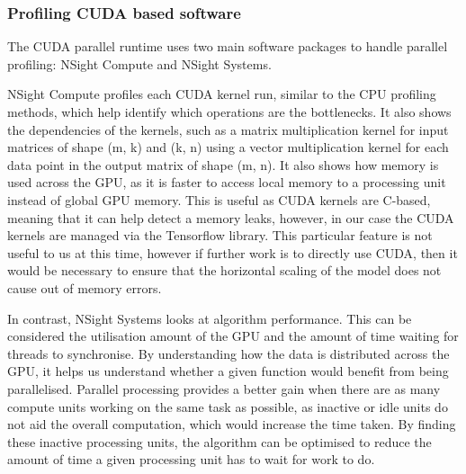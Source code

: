 \subsubsection{Profiling CUDA based software}
The CUDA parallel runtime uses two main software packages to handle parallel profiling: NSight Compute and NSight Systems.

NSight Compute profiles each CUDA kernel run, similar to the CPU profiling methods, which help identify which operations are the bottlenecks.
It also shows the dependencies of the kernels, such as a matrix multiplication kernel for input matrices of shape (m, k) and (k, n) using a vector multiplication kernel for each data point in the output matrix of shape (m, n).
It also shows how memory is used across the GPU, as it is faster to access local memory to a processing unit instead of global GPU memory. 
This is useful as CUDA kernels are C-based, meaning that it can help detect a memory leaks, however, in our case the CUDA kernels are managed via the Tensorflow library.
This particular feature is not useful to us at this time, however if further work is to directly use CUDA, then it would be necessary to ensure that the horizontal scaling of the model does not cause out of memory errors.

In contrast, NSight Systems looks at algorithm performance.
This can be considered the utilisation amount of the GPU and the amount of time waiting for threads to synchronise.
By understanding how the data is distributed across the GPU, it helps us understand whether a given function would benefit from being parallelised.
Parallel processing provides a better gain when there are as many compute units working on the same task as possible, as inactive or idle units do not aid the overall computation, which would increase the time taken.
By finding these inactive processing units, the algorithm can be optimised to reduce the amount of time a given processing unit has to wait for work to do.


